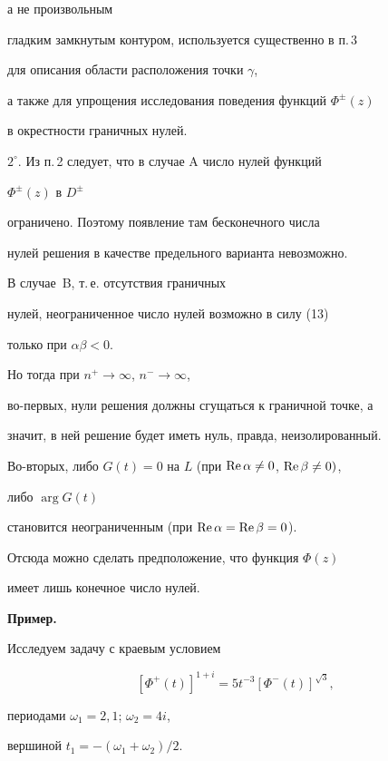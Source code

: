 а не произвольным


гладким замкнутым контуром, используется существенно в п.\,3


для описания области расположения точки $\gamma$,


а также для упрощения исследования поведения функций $\Phi^{\pm}(z)$


в окрестности граничных нулей.





$2^\circ$. Из п.\,2 следует, что в случае A число нулей функций


$\Phi^{\pm}(z)$ в $D^{\pm}$


ограничено. Поэтому появление там бесконечного числа


нулей решения в качестве предельного варианта невозможно.


В случае~B, т.\,е. отсутствия граничных


нулей, неограниченное число нулей возможно в силу (13)


только при $\alpha\beta < 0$.


Но тогда при $n^+\to\infty$, $n^-\to\infty$,


во-первых, нули решения должны сгущаться к граничной точке, а


значит, в ней решение будет иметь нуль, правда, неизолированный.


Во-вторых, либо $G(t)=0$ на $L$ (при $\operatorname{Re} \alpha\ne 0$, $\operatorname{Re} \beta\ne 0)$,


либо $\arg G(t)$


становится неограниченным (при $\operatorname{Re} \alpha =\operatorname{Re}\beta =0$).


Отсюда можно сделать предположение, что функция $\Phi(z)$


имеет лишь конечное число нулей.


\medskip





{\bf Пример.}


Исследуем задачу с краевым условием


\begin{equation}


[\Phi^+(t)]^{1+i}= 5t^{-3}[\Phi^-(t)]^{\sqrt{3}},


\end{equation}


периодами $\omega_1 = 2,1$; $\omega_2 = 4i$,


вершиной $t_1 = -(\omega_1 + \omega_2)/2$.


